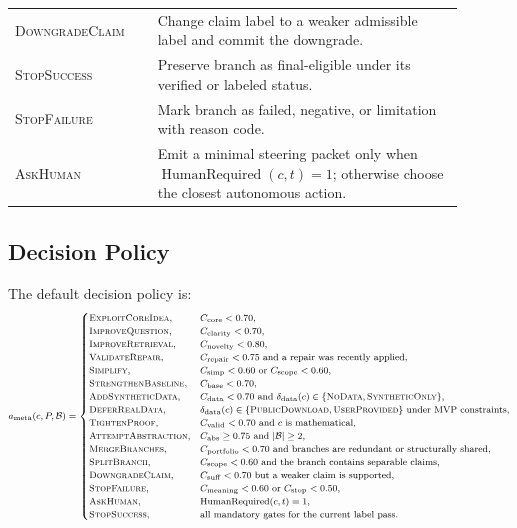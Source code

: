 \documentclass[11pt]{article}
\begin{document}
\begin{center}
\begin{tabular}{p{0.29\linewidth} p{0.60\linewidth}}
\textsc{DowngradeClaim} & Change claim label to a weaker admissible label and commit the downgrade. \\
\textsc{StopSuccess} & Preserve branch as final-eligible under its verified or labeled status. \\
\textsc{StopFailure} & Mark branch as failed, negative, or limitation with reason code. \\
\textsc{AskHuman} & Emit a minimal steering packet only when $\operatorname{HumanRequired}(c,t)=1$; otherwise choose the closest autonomous action. \\
\bottomrule
\end{tabular}
\end{center}

\subsection{Decision Policy}

The default decision policy is:
$$
\footnotesize
\begin{aligned}
a_{\mathrm{meta}}(c,P,\mathcal{B})=
\begin{cases}
\textsc{ExploitCoreIdea}, & C_{\mathrm{core}}<0.70,\\
\textsc{ImproveQuestion}, & C_{\mathrm{clarity}}<0.70,\\
\textsc{ImproveRetrieval}, & C_{\mathrm{novelty}}<0.80,\\
\textsc{ValidateRepair}, & C_{\mathrm{repair}}<0.75\ \text{and a repair was recently applied},\\
\textsc{Simplify}, & C_{\mathrm{simp}}<0.60\ \text{or }C_{\mathrm{scope}}<0.60,\\
\textsc{StrengthenBaseline}, & C_{\mathrm{base}}<0.70,\\
\textsc{AddSyntheticData}, & C_{\mathrm{data}}<0.70\ \text{and }\delta_{\text{data}}(c)\in\{\textsc{NoData},\textsc{SyntheticOnly}\},\\
\textsc{DeferRealData}, & \delta_{\text{data}}(c)\in\{\textsc{PublicDownload},\textsc{UserProvided}\}\ \text{under MVP constraints},\\
\textsc{TightenProof}, & C_{\mathrm{valid}}<0.70\ \text{and }c\text{ is mathematical},\\
\textsc{AttemptAbstraction}, & C_{\mathrm{abs}}\geq0.75\ \text{and }|\mathcal{B}|\geq2,\\
\textsc{MergeBranches}, & C_{\mathrm{portfolio}}<0.70\ \text{and branches are redundant or structurally shared},\\
\textsc{SplitBranch}, & C_{\mathrm{scope}}<0.60\ \text{and the branch contains separable claims},\\
\textsc{DowngradeClaim}, & C_{\mathrm{suff}}<0.70\ \text{but a weaker claim is supported},\\
\textsc{StopFailure}, & C_{\mathrm{meaning}}<0.60\ \text{or }C_{\mathrm{stop}}<0.50,\\
\textsc{AskHuman}, & \operatorname{HumanRequired}(c,t)=1,\\
\textsc{StopSuccess}, & \text{all mandatory gates for the current label pass}.
\end{cases}
\end{aligned}
$$
\end{document}
